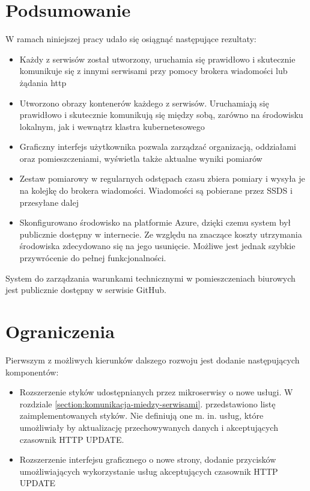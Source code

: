 \clearpage
\section{Podsumowanie}

W ramach niniejszej pracy udało się osiągnąć następujące rezultaty:

\begin{itemize}
    \item Każdy z serwisów został utworzony, uruchamia się prawidłowo i skutecznie
    komunikuje się z innymi serwisami przy pomocy brokera wiadomości lub
    żądania http
    \item Utworzono obrazy kontenerów każdego z serwisów. Uruchamiają się prawidłowo
    i skutecznie komunikują się między sobą, zarówno na środowisku lokalnym, jak
    i wewnątrz klastra kubernetesowego
    \item Graficzny interfejs użytkownika pozwala zarządzać organizacją, oddziałami
    oraz pomieszczeniami, wyświetla także aktualne wyniki pomiarów
    \item Zestaw pomiarowy w regularnych odstępach czasu zbiera pomiary i wysyła je 
    na kolejkę do brokera wiadomości. Wiadomości są pobierane przez SSDS i przesyłane 
    dalej
    \item Skonfigurowano środowisko na platformie Azure, dzięki czemu system
    był publicznie dostępny w internecie. Ze względu na znaczące koszty utrzymania 
    środowiska zdecydowano się na jego usunięcie. Możliwe jest jednak
    szybkie przywrócenie do pełnej funkcjonalności.
\end{itemize}

System do zarządzania warunkami technicznymi w pomieszczeniach biurowych jest publicznie
dostępny w serwisie GitHub\cite{github2022}.

\newpage
\section{Ograniczenia}

Pierwszym z możliwych kierunków dalszego rozwoju jest dodanie następujących komponentów:

\begin{itemize}
    \item Rozszerzenie styków udostępnianych przez mikroserwisy o nowe usługi. W rozdziale
    \ref{section:komunikacja-miedzy-serwisami}. przedstawiono listę zaimplementowanych 
    styków. Nie definiują one m. in. usług, które umożliwiały by aktualizację przechowywanych
    danych i akceptujących czasownik HTTP UPDATE.
    \item Rozszerzenie interfejsu graficznego o nowe strony, dodanie przycisków umożliwiających
    wykorzystanie usług akceptujących czasownik HTTP UPDATE
\end{itemize}


